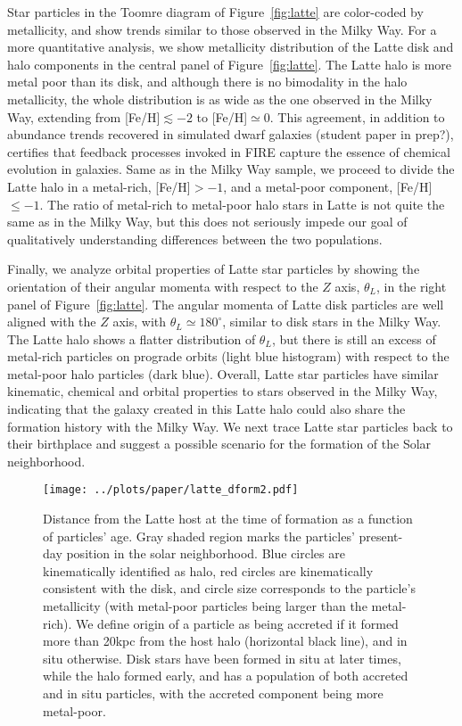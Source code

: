 \documentclass[apj, twocolappendix, numberedappendix, appendixfloats]{emulateapj}
\begin{document}
Star particles in the Toomre diagram of Figure~\ref{fig:latte} are color-coded by metallicity, and show trends similar to those observed in the Milky Way.
For a more quantitative analysis, we show metallicity distribution of the Latte disk and halo components in the central panel of Figure~\ref{fig:latte}.
The Latte halo is more metal poor than its disk, and although there is no bimodality in the halo metallicity, the whole distribution is as wide as the one observed in the Milky Way, extending from [Fe/H]$\lesssim-2$ to [Fe/H]$\simeq0$.
This agreement, in addition to abundance trends recovered in simulated dwarf galaxies (student paper in prep?), certifies that feedback processes invoked in FIRE capture the essence of chemical evolution in galaxies.
Same as in the Milky Way sample, we proceed to divide the Latte halo in a metal-rich, [Fe/H]$>-1$, and a metal-poor component, [Fe/H]$\leq-1$.
The ratio of metal-rich to metal-poor halo stars in Latte is not quite the same as in the Milky Way, but this does not seriously impede our goal of qualitatively understanding differences between the two populations.

Finally, we analyze orbital properties of Latte star particles by showing the orientation of their angular momenta with respect to the $Z$ axis, $\theta_L$, in the right panel of Figure~\ref{fig:latte}.
The angular momenta of Latte disk particles are well aligned with the $Z$ axis, with $\theta_L\simeq180^\circ$, similar to disk stars in the Milky Way.
The Latte halo shows a flatter distribution of $\theta_L$, but there is still an excess of metal-rich particles on prograde orbits (light blue histogram) with respect to the metal-poor halo particles (dark blue).
Overall, Latte star particles have similar kinematic, chemical and orbital properties to stars observed in the Milky Way, indicating that the galaxy created in this Latte halo could also share the formation history with the Milky Way.
We next trace Latte star particles back to their birthplace and suggest a possible scenario for the formation of the Solar neighborhood.

\begin{figure}
\begin{center}
\texttt{[image: ../plots/paper/latte\_dform2.pdf]}
\caption{Distance from the Latte host at the time of formation as a function of particles' age.
Gray shaded region marks the particles' present-day position in the solar neighborhood.
Blue circles are kinematically identified as halo, red circles are kinematically consistent with the disk, and circle size corresponds to the particle's metallicity (with metal-poor particles being larger than the metal-rich).
We define origin of a particle as being accreted if it formed more than 20\;kpc from the host halo (horizontal black line), and in situ otherwise.
Disk stars have been formed in situ at later times, while the halo formed early, and has a population of both accreted and in situ particles, with the accreted component being more metal-poor.}
\label{fig:dform}
\end{center}
\end{figure}
\end{document}

